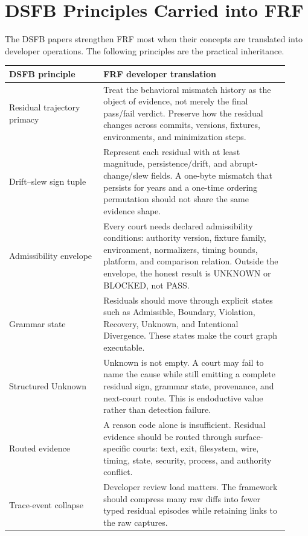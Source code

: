 \documentclass[11pt,a4paper]{article}
\newcommand{\frf}{\textsc{FRF}}
\newcommand{\dsfb}{\textsc{DSFB}}
\begin{document}
\section{DSFB Principles Carried into FRF}
\label{sec:dsfb-principles}

The \dsfb{} papers strengthen \frf{} most when their concepts are translated into developer operations. The following principles are the practical inheritance.

\begin{longtable}{>{\raggedright\arraybackslash}p{0.31\linewidth}>{\raggedright\arraybackslash}p{0.61\linewidth}}
\toprule
\textbf{DSFB principle} & \textbf{FRF developer translation} \\
\midrule
\endhead
Residual trajectory primacy & Treat the behavioral mismatch history as the object of evidence, not merely the final pass/fail verdict. Preserve how the residual changes across commits, versions, fixtures, environments, and minimization steps. \\
Drift--slew sign tuple & Represent each residual with at least magnitude, persistence/drift, and abrupt-change/slew fields. A one-byte mismatch that persists for years and a one-time ordering permutation should not share the same evidence shape. \\
Admissibility envelope & Every court needs declared admissibility conditions: authority version, fixture family, environment, normalizers, timing bounds, platform, and comparison relation. Outside the envelope, the honest result is UNKNOWN or BLOCKED, not PASS. \\
Grammar state & Residuals should move through explicit states such as Admissible, Boundary, Violation, Recovery, Unknown, and Intentional Divergence. These states make the court graph executable. \\
Structured Unknown & Unknown is not empty. A court may fail to name the cause while still emitting a complete residual sign, grammar state, provenance, and next-court route. This is endoductive value rather than detection failure. \\
Routed evidence & A reason code alone is insufficient. Residual evidence should be routed through surface-specific courts: text, exit, filesystem, wire, timing, state, security, process, and authority conflict. \\
Trace-event collapse & Developer review load matters. The framework should compress many raw diffs into fewer typed residual episodes while retaining links to the raw captures. \\

\end{longtable}
\end{document}
